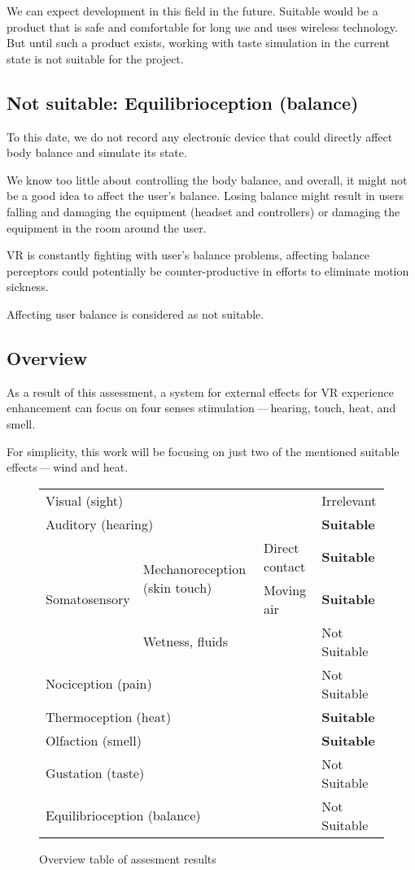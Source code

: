 We can expect development in this field in the future. Suitable would be a product
that is safe and comfortable for long use and uses wireless
technology. But until such a product exists, working with taste simulation
in the current state is not suitable for the project.


\subsection{Not suitable: Equilibrioception (balance)}
To this date, we do not record any electronic device that could
directly affect body balance and simulate its state.


We know too little about controlling the body balance, and overall,
it might not be a good idea to affect the user’s balance. Losing
balance might result in users falling and damaging the equipment (headset and
controllers) or damaging the equipment in the room around the user.


VR is constantly fighting with user’s balance problems,
affecting balance perceptors could potentially be
counter-productive in efforts to eliminate motion sickness.


Affecting user balance is considered as not suitable.


\hypertarget{x-overview}{\subsection{Overview}}
As a result of this assessment, a system for external effects for VR experience
enhancement can focus on four senses stimulation — hearing, touch, heat,
and smell.


For simplicity, this work will be focusing on just two of the mentioned suitable
effects — wind and heat.

\begin{center}
\begin{figure}
\begin{tabular}{|l|l|l|l|}
\hline
\multicolumn{3}{|l|}{Visual (sight)} & Irrelevant \\ 
\multicolumn{3}{|l|}{Auditory (hearing)} & \textbf{Suitable} \\ 
\multirow{3}{*}{Somatosensory} & \multirow{2}{*}{Mechanoreception (skin touch)}  & Direct contact & \textbf{Suitable} \\ 
& & Moving air & \textbf{Suitable} \\ 
& \multicolumn{2}{|l|}{Wetness, fluids} & Not Suitable \\ 
\multicolumn{3}{|l|}{Nociception (pain)} & Not Suitable \\ 
\multicolumn{3}{|l|}{Thermoception (heat)} & \textbf{Suitable} \\ 
\multicolumn{3}{|l|}{Olfaction (smell)} & \textbf{Suitable} \\ 
\multicolumn{3}{|l|}{Gustation (taste)} & Not Suitable \\ 
\multicolumn{3}{|l|}{Equilibrioception (balance)} & Not Suitable \\ 
\hline
\end{tabular}
\caption{Overview table of assesment results}
\end{figure}
\end{center}


